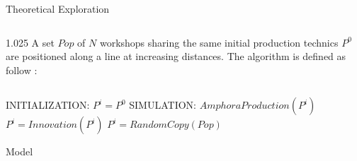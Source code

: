 \documentclass[final]{beamer}
\newlength{\sepwid}
\newlength{\onecolwid}
\newlength{\twocolwid}
\begin{document}
\begin{frame}[t]
\begin{columns}[t]
\begin{column}{\twocolwid}
\begin{block}{Theoretical Exploration}
\begin{columns}[t,totalwidth=\twocolwid]
\begin{column}{1.025\onecolwid}
A set $Pop$ of $N$ workshops sharing the same initial production technics $P^{0}$ are positioned along a line at increasing distances.%
 The algorithm is defined as follow : %
\vspace{.7cm}

\begin{columns}
	    \centering
%	    
    \begin{column}{.9\textwidth}
	\begin{algorithm}[H]
	    \begin{algorithmic}
		\footnotesize
		\State INITIALIZATION:
		\State $P^{i} = P^{0}$
		\EndFor
		\State SIMULATION:
		\State $AmphoraProduction(P^{i})$
		\State $P^{i}=Innovation(P^{i})$ 
		\State $P^{i}=RandomCopy(Pop)$	
		\EndIf
		\EndFor
		\EndLoop
	    \end{algorithmic}
	    \caption{Model }
	    \label{fig:mod}
	\end{algorithm}
   \end{column}
\end{columns}






\end{column}



\end{columns}
\end{block}
\end{column}
\end{columns}
\end{frame}
\end{document}

